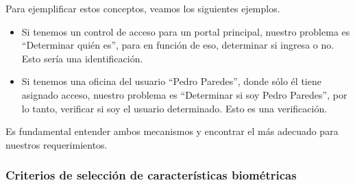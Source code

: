 Para ejemplificar estos conceptos, veamos los siguientes ejemplos.

\begin{itemize}

\item Si tenemos un control de acceso para un portal principal, nuestro problema es ``Determinar quién es'', para en función de eso, determinar si ingresa o no. Esto sería una identificación.

\item Si tenemos una oficina del usuario ``Pedro Paredes'', donde sólo él tiene asignado acceso, nuestro problema es ``Determinar si soy Pedro Paredes'', por lo tanto, verificar si soy el usuario determinado. Esto es una verificación.
\end{itemize}

Es fundamental entender ambos mecanismos y encontrar el más adecuado para nuestros requerimientos.

\subsubsection{Criterios de selección de características biométricas}

